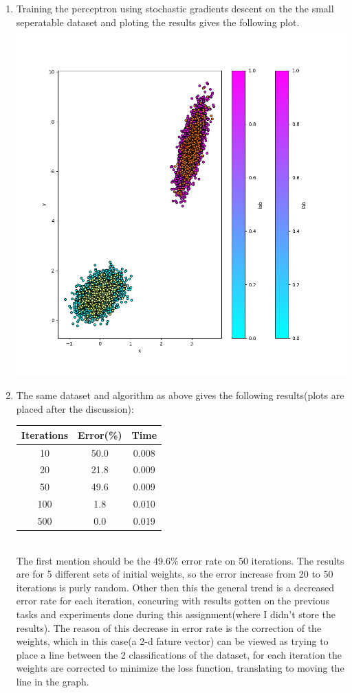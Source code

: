 \documentclass{article}
\begin{document}
\begin{enumerate}
\item Training the perceptron using stochastic gradients descent on the the
  small seperatable dataset and ploting the results gives the following plot. \\
  \noindent\includegraphics[scale=0.7]{plots_percep}

\item The same dataset and algorithm as above gives the following results(plots
  are placed after the discussion): \\
  \begin{tabular}{|c|c|c|}
    \hline
    Iterations & Error(\%) & Time \\
    \hline
    10 & 50.0 & 0.008 \\
    20 & 21.8 & 0.009 \\
    50 & 49.6 & 0.009 \\
    100 & 1.8 & 0.010 \\
    500 & 0.0 & 0.019 \\
    \hline
  \end{tabular} \\
  The first mention should be the 49.6\% error rate on 50 iterations. The
  results are for 5 different sets of initial weights, so the error increase from 20 to 50
  iterations is purly random. Other then this the general trend is a decreased error rate for
  each iteration, concuring with results gotten on the previous tasks and
  experiments done during this assignment(where I didn't store the results). The
  reason of this decrease in error rate is the correction of the weights, which
  in this case(a 2-d fature vector) can be viewed as trying to place a line
  between the 2 classifications of the dataset, for each iteration the weights are
  corrected to minimize the loss function, translating to moving the line in the
  graph.


\end{enumerate}
\end{document}
